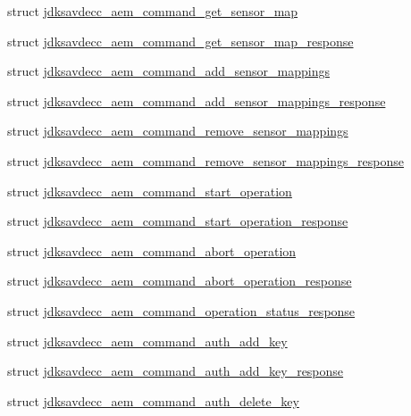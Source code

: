 \begin{DoxyCompactItemize}
\item 
struct \hyperlink{structjdksavdecc__aem__command__get__sensor__map}{jdksavdecc\+\_\+aem\+\_\+command\+\_\+get\+\_\+sensor\+\_\+map}
\item 
struct \hyperlink{structjdksavdecc__aem__command__get__sensor__map__response}{jdksavdecc\+\_\+aem\+\_\+command\+\_\+get\+\_\+sensor\+\_\+map\+\_\+response}
\item 
struct \hyperlink{structjdksavdecc__aem__command__add__sensor__mappings}{jdksavdecc\+\_\+aem\+\_\+command\+\_\+add\+\_\+sensor\+\_\+mappings}
\item 
struct \hyperlink{structjdksavdecc__aem__command__add__sensor__mappings__response}{jdksavdecc\+\_\+aem\+\_\+command\+\_\+add\+\_\+sensor\+\_\+mappings\+\_\+response}
\item 
struct \hyperlink{structjdksavdecc__aem__command__remove__sensor__mappings}{jdksavdecc\+\_\+aem\+\_\+command\+\_\+remove\+\_\+sensor\+\_\+mappings}
\item 
struct \hyperlink{structjdksavdecc__aem__command__remove__sensor__mappings__response}{jdksavdecc\+\_\+aem\+\_\+command\+\_\+remove\+\_\+sensor\+\_\+mappings\+\_\+response}
\item 
struct \hyperlink{structjdksavdecc__aem__command__start__operation}{jdksavdecc\+\_\+aem\+\_\+command\+\_\+start\+\_\+operation}
\item 
struct \hyperlink{structjdksavdecc__aem__command__start__operation__response}{jdksavdecc\+\_\+aem\+\_\+command\+\_\+start\+\_\+operation\+\_\+response}
\item 
struct \hyperlink{structjdksavdecc__aem__command__abort__operation}{jdksavdecc\+\_\+aem\+\_\+command\+\_\+abort\+\_\+operation}
\item 
struct \hyperlink{structjdksavdecc__aem__command__abort__operation__response}{jdksavdecc\+\_\+aem\+\_\+command\+\_\+abort\+\_\+operation\+\_\+response}
\item 
struct \hyperlink{structjdksavdecc__aem__command__operation__status__response}{jdksavdecc\+\_\+aem\+\_\+command\+\_\+operation\+\_\+status\+\_\+response}
\item 
struct \hyperlink{structjdksavdecc__aem__command__auth__add__key}{jdksavdecc\+\_\+aem\+\_\+command\+\_\+auth\+\_\+add\+\_\+key}
\item 
struct \hyperlink{structjdksavdecc__aem__command__auth__add__key__response}{jdksavdecc\+\_\+aem\+\_\+command\+\_\+auth\+\_\+add\+\_\+key\+\_\+response}
\item 
struct \hyperlink{structjdksavdecc__aem__command__auth__delete__key}{jdksavdecc\+\_\+aem\+\_\+command\+\_\+auth\+\_\+delete\+\_\+key}

\end{DoxyCompactItemize}
